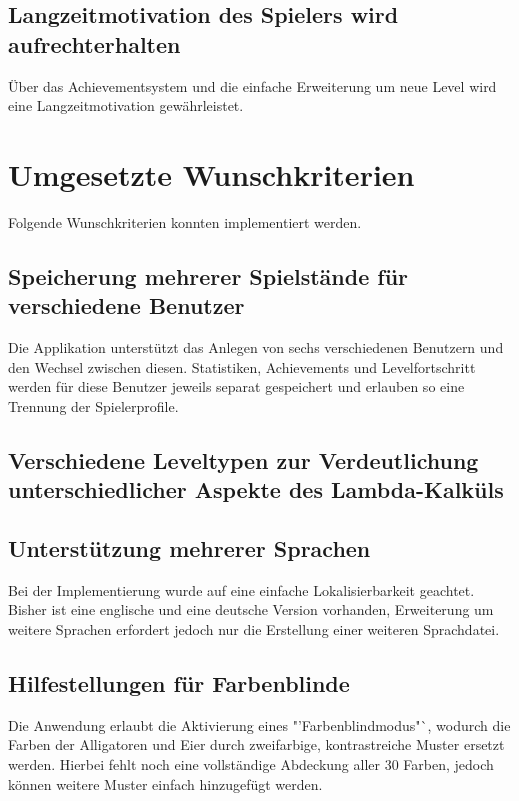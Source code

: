 \subsection{Langzeitmotivation des Spielers wird aufrechterhalten}

Über das Achievementsystem und die einfache Erweiterung um neue Level wird eine Langzeitmotivation gewährleistet.


\section{Umgesetzte Wunschkriterien}

Folgende Wunschkriterien konnten implementiert werden.

\subsection{Speicherung mehrerer Spielstände für verschiedene Benutzer}

Die Applikation unterstützt das Anlegen von sechs verschiedenen Benutzern und den Wechsel zwischen diesen.
Statistiken, Achievements und Levelfortschritt werden für diese Benutzer jeweils separat gespeichert und erlauben so eine Trennung der Spielerprofile.

\subsection{Verschiedene Leveltypen zur Verdeutlichung unterschiedlicher Aspekte des Lambda-Kalküls}


\subsection{Unterstützung mehrerer Sprachen}

Bei der Implementierung wurde auf eine einfache Lokalisierbarkeit geachtet.
Bisher ist eine englische und eine deutsche Version vorhanden, Erweiterung um weitere Sprachen erfordert jedoch nur die Erstellung einer weiteren Sprachdatei.

\subsection{Hilfestellungen für Farbenblinde}

Die Anwendung erlaubt die Aktivierung eines "'Farbenblindmodus"`, wodurch die Farben der Alligatoren und Eier durch zweifarbige, kontrastreiche Muster ersetzt werden.
Hierbei fehlt noch eine vollständige Abdeckung aller 30 Farben, jedoch können weitere Muster einfach hinzugefügt werden.

